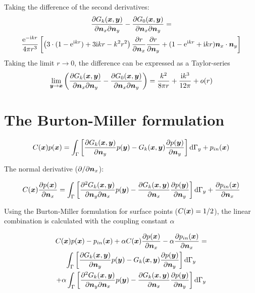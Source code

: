 \documentclass[a4paper, 10pt]{article}
\newcommand{\te}{\mathrm{e}}
\newcommand{\ti}{\mathrm{i}}
\newcommand{\td}{\mathrm{d}}
\newcommand{\tn}{\bm{\mathnormal{n}}}
\newcommand{\tx}{\bm{\mathnormal{x}}}
\newcommand{\ty}{\bm{\mathnormal{y}}}
\newcommand{\sx}{\bm{\mathnormal{x}}}
\newcommand{\sy}{\bm{\mathnormal{y}}}
\newcommand{\sn}{\bm{\mathnormal{n}}}
\begin{document}
Taking the difference of the second derivatives:
%
\begin{multline}
	\frac{\partial G_k(\tx, \ty)}{\partial \tn_x \partial \tn_y} - \frac{\partial G_0(\tx, \ty)}{\partial \tn_x \partial \tn_y} = \\
	\frac{\te^{- \ti kr}}{4 \pi r^3}\left[\left(3 \cdot (1 - \te^{\ti kr}) + 3 \ti kr - k^2 r^2\right) \frac{\partial r}{\partial \tn_x}\frac{\partial r}{\partial \tn_y} + (1 - \te^{\ti kr} + \ti kr) \tn_x \cdot \tn_y \right]
\end{multline}
%
Taking the limit $r \rightarrow 0$, the difference can be expressed as a Taylor-series
%
\begin{equation}
	\lim\limits_{\sy \rightarrow \sx} \left(\frac{\partial G_k(\tx, \ty)}{\partial \tn_x \partial \tn_y} - \frac{\partial G_0(\tx, \ty)}{\partial \tn_x \partial \tn_y}\right) = \frac{k^2}{8 \pi r} + \frac{\ti k^3}{12 \pi} + o(r)
\end{equation}

\section{The Burton-Miller formulation}

\begin{equation}
	C(\sx) p (\sx) = \int_{\Gamma}\left[\frac{\partial{G}_k (\sx, \sy)}{\partial \sn_y} p(\sy)
	- G_k(\sx,\sy)\frac{\partial p(\sy)}{\partial \sn_y}\right] \td \Gamma_y + p_{in}(\sx)
\end{equation}

The normal derivative ($ \partial / \partial \sn_x$):

\begin{equation}
	C(\sx) \frac{\partial p(\sx)}{\partial \sn_x}
	=
	\int_{\Gamma}\left[\frac{\partial^2{G}_k (\sx, \sy)}{\partial \sn_y \partial \sn_x} p(\sy) - \frac{\partial G_k(\sx,\sy)}{\partial \sn_x}\frac{\partial p(\sy)}{\partial \sn_y}\right] \td \Gamma_y + \frac{\partial p_{in}(\sx)}{\partial \sn_x}
\end{equation}

Using the Burton-Miller formulation for surface points ($C(\sx) = 1/2$), the linear combination is calculated with the coupling constant $\alpha$

\begin{multline}
	C(\sx) p (\sx) - p_{in}(\sx)
	+
	\alpha C(\sx) \frac{\partial p(\sx)}{\partial \sn_x}
	-
	\alpha \frac{\partial p_{in}(\sx)}{\partial \sn_x}
	= \\
	\int_{\Gamma}\left[\frac{\partial{G}_k (\sx, \sy)}{\partial \sn_y} p(\sy)
	- G_k(\sx,\sy)\frac{\partial p(\sy)}{\partial \sn_y}\right] \td \Gamma_y \\
	+
	\alpha \int_{\Gamma}
	\left[
	\frac{\partial^2{G}_k (\sx, \sy)}{\partial \sn_y \partial \sn_x} p(\sy)
	- \frac{\partial G_k(\sx,\sy)}{\partial \sn_x}\frac{\partial p(\sy)}{\partial \sn_y}
	\right] \td \Gamma_y
\end{multline}
\end{document}
